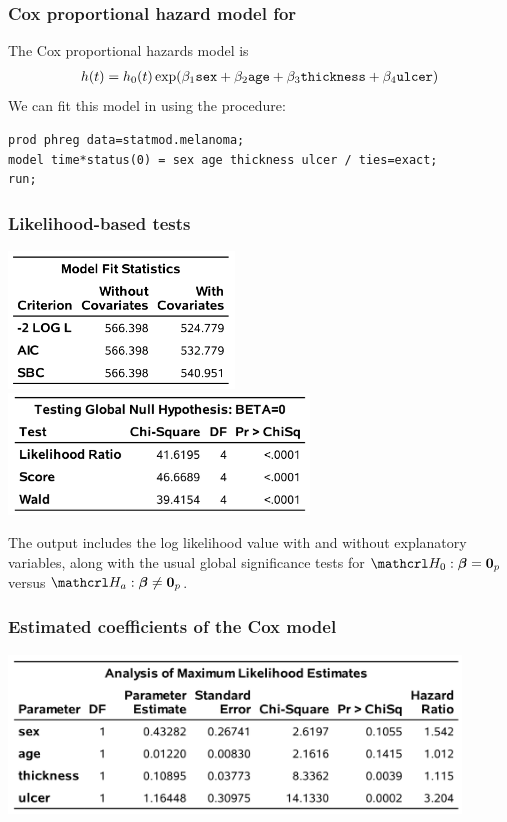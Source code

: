 \documentclass{beamer}
\begin{document}
\begin{frame}[fragile]
\frametitle{Cox proportional hazard model for }
 The Cox proportional hazards model is 
\begin{align*}
h(t) = h_0(t) \exp( \beta_1 \texttt{sex} + \beta_2 \texttt{age} + \beta_3 \texttt{thickness} + \beta_4 \texttt{ulcer})
\end{align*}
 We can fit this model in \SASlang{}  using the  procedure:
\vp \vp
\begin{tcolorbox}[colback=white,colframe=hecblue,title=\SASlang{} code for fitting a proportional hazard model]
{\footnotesize 
\begin{verbatim}
prod phreg data=statmod.melanoma;
model time*status(0) = sex age thickness ulcer / ties=exact;
run;
\end{verbatim}
}
\end{tcolorbox}
\end{frame}

\begin{frame}
\frametitle{Likelihood-based tests}
\vp \vp
\begin{center}
\includegraphics[width = 0.45\textwidth]{img/c7/slides7e12}
\includegraphics[width = 0.6\textwidth]{img/c7/slides7e13}
\end{center}
{\footnotesize
The output includes the log likelihood value with and without explanatory variables, along with the usual global significance tests for $\Hy_0: \bs{\beta}=\bs{0}_p$ versus $\Hy_a: \bs{\beta} \neq \bs{0}_p$.

}
\end{frame}

\begin{frame}
\frametitle{Estimated coefficients of the Cox model}
\vp \vp
\begin{center}
\includegraphics[width = 0.9\textwidth]{img/c7/slides7e14}
\end{center}
% 

\end{frame}
\end{document}
